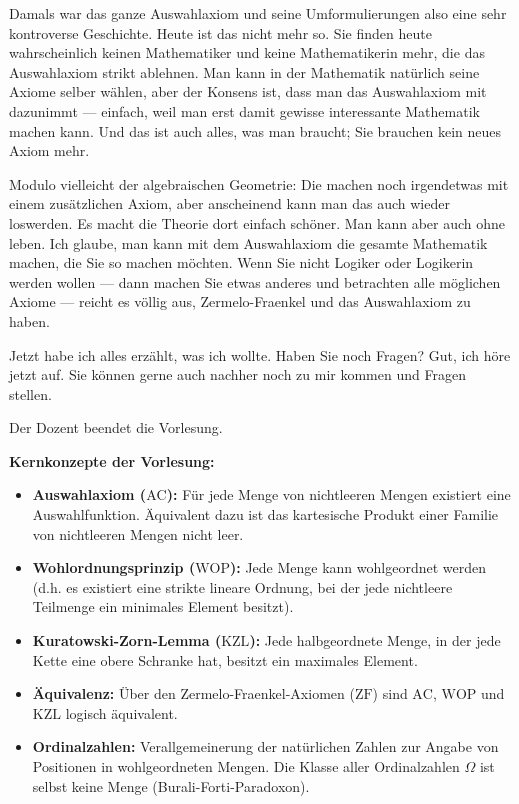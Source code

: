 \begin{spoken-clean}[01:10:40 - 01:12:40]
Damals war das ganze Auswahlaxiom und seine Umformulierungen also eine sehr kontroverse Geschichte. Heute ist das nicht mehr so. Sie finden heute wahrscheinlich keinen Mathematiker und keine Mathematikerin mehr, die das Auswahlaxiom strikt ablehnen. Man kann in der Mathematik natürlich seine Axiome selber wählen, aber der Konsens ist, dass man das Auswahlaxiom mit dazunimmt --- einfach, weil man erst damit gewisse interessante Mathematik machen kann. Und das ist auch alles, was man braucht; Sie brauchen kein neues Axiom mehr.

Modulo vielleicht der algebraischen Geometrie: Die machen noch irgendetwas mit einem zusätzlichen Axiom, aber anscheinend kann man das auch wieder loswerden. Es macht die Theorie dort einfach schöner. Man kann aber auch ohne leben. Ich glaube, man kann mit dem Auswahlaxiom die gesamte Mathematik machen, die Sie so machen möchten. Wenn Sie nicht Logiker oder Logikerin werden wollen --- dann machen Sie etwas anderes und betrachten alle möglichen Axiome --- reicht es völlig aus, Zermelo-Fraenkel und das Auswahlaxiom zu haben.
\end{spoken-clean}

\begin{spoken-clean}[01:12:40 - 01:33:02]
Jetzt habe ich alles erzählt, was ich wollte. Haben Sie noch Fragen? Gut, ich höre jetzt auf. Sie können gerne auch nachher noch zu mir kommen und Fragen stellen.
\end{spoken-clean}

\begin{meta-note}
Der Dozent beendet die Vorlesung.
\end{meta-note}

\begin{nice-box}
\textbf{Kernkonzepte der Vorlesung:}
\begin{itemize}
    \item \textbf{Auswahlaxiom ($\text{AC}$):} Für jede Menge von nichtleeren Mengen existiert eine Auswahlfunktion. Äquivalent dazu ist das kartesische Produkt einer Familie von nichtleeren Mengen nicht leer.
    \item \textbf{Wohlordnungsprinzip ($\text{WOP}$):} Jede Menge kann wohlgeordnet werden (d.h. es existiert eine strikte lineare Ordnung, bei der jede nichtleere Teilmenge ein minimales Element besitzt).
    \item \textbf{Kuratowski-Zorn-Lemma ($\text{KZL}$):} Jede halbgeordnete Menge, in der jede Kette eine obere Schranke hat, besitzt ein maximales Element.
    \item \textbf{Äquivalenz:} Über den Zermelo-Fraenkel-Axiomen ($\text{ZF}$) sind $\text{AC}$, $\text{WOP}$ und $\text{KZL}$ logisch äquivalent.
    \item \textbf{Ordinalzahlen:} Verallgemeinerung der natürlichen Zahlen zur Angabe von Positionen in wohlgeordneten Mengen. Die Klasse aller Ordinalzahlen $\Omega$ ist selbst keine Menge (Burali-Forti-Paradoxon).
\end{itemize}
\end{nice-box}